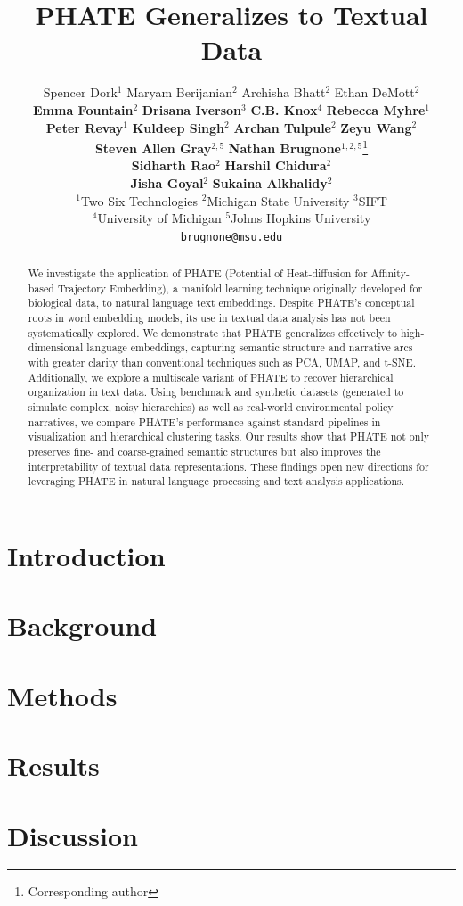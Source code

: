 \documentclass[11pt]{article}
\title{PHATE Generalizes to Textual Data}
\author{Spencer Dork$^{1}$ \quad Maryam Berijanian$^{2}$ \quad Archisha Bhatt$^2$ \quad Ethan DeMott$^2$ \\ \textbf{Emma Fountain}$^2$ \quad
\textbf{Drisana Iverson}$^3$ \quad \textbf{C.B. Knox}$^4$ \quad \textbf{Rebecca Myhre}$^1$ \\ \textbf{Peter Revay}$^1$ \quad \textbf{Kuldeep Singh}$^{2}$ \quad \textbf{Archan Tulpule}$^{2}$ \quad \textbf{Zeyu Wang}$^2$ \\ \textbf{Steven Allen Gray}$^{2,5}$ \quad \textbf{Nathan Brugnone}$^{1,2,5}$\thanks{Corresponding author}\\
\textbf{Sidharth Rao}$^2$ \quad 
\textbf{Harshil Chidura}$^2$ \\
\textbf{Jisha Goyal}$^2$ \quad 
\textbf{Sukaina Alkhalidy}$^2$\\
$^1$Two Six Technologies \quad $^2$Michigan State University \quad $^3$SIFT \\ $^4$University of Michigan \quad $^5$Johns Hopkins University\\
\texttt{brugnone@msu.edu}
}
\begin{document}
\maketitle
\begin{abstract}
We investigate the application of PHATE (Potential of Heat-diffusion for Affinity-based Trajectory Embedding), a manifold learning technique originally developed for biological data, to natural language text embeddings. Despite PHATE’s conceptual roots in word embedding models, its use in textual data analysis has not been systematically explored. We demonstrate that PHATE generalizes effectively to high-dimensional language embeddings, capturing semantic structure and narrative arcs with greater clarity than conventional techniques such as PCA, UMAP, and t-SNE. Additionally, we explore a multiscale variant of PHATE to recover hierarchical organization in text data. Using benchmark and synthetic datasets (generated to simulate complex, noisy hierarchies) as well as real-world environmental policy narratives, we compare PHATE’s performance against standard pipelines in visualization and hierarchical clustering tasks. Our results show that PHATE not only preserves fine- and coarse-grained semantic structures but also improves the interpretability of textual data representations. These findings open new directions for leveraging PHATE in natural language processing and text analysis applications.
\end{abstract}

\section{Introduction}


\section{Background}


\section{Methods}


\section{Results}


\section{Discussion}

\end{document}
